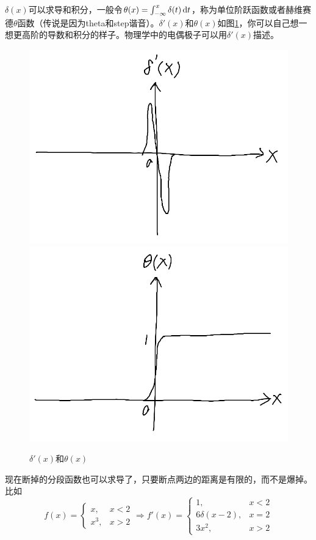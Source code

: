 $\delta(x)$可以求导和积分，一般令$\theta(x)=\int_{-\infty}^x \delta(t) \mathop{}\!\mathrm{d} t$，称为单位阶跃函数或者赫维赛德$\theta$函数（传说是因为theta和step谐音）。$\delta'(x)$和$\theta(x)$如图\ref{fig-delta-d-x}，你可以自己想一想更高阶的导数和积分的样子。物理学中的电偶极子可以用$\delta'(x)$描述。
\begin{figure}[htb]
\centering
\includegraphics[scale=0.5]{fig/delta-d-x.png}
\includegraphics[scale=0.5]{fig/theta-x.png}
\caption{$\delta'(x)$和$\theta(x)$}
\label{fig-delta-d-x}
\end{figure}

现在断掉的分段函数也可以求导了，只要断点两边的距离是有限的，而不是爆掉。比如
\begin{equation*}
f(x)=\begin{cases}
x, &x<2 \\
x^3, &x>2
\end{cases} \Rightarrow f'(x)=\begin{cases}
1, &x<2 \\
6 \delta(x-2), &x=2 \\
3x^2, &x>2
\end{cases}
\end{equation*}

